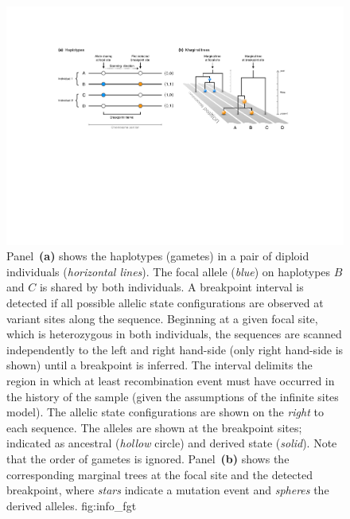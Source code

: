 

\begin{figure}[!htb]
\centering
\includegraphics[width=\textwidth]{./img/ch3/info_fgt_new}
{Panel~\textbf{(a)} shows the  haplotypes (gametes) in a pair of  diploid individuals (\emph{horizontal lines}).
The focal allele (\emph{blue}) on haplotypes $B$ and $C$ is shared by both individuals.
A breakpoint interval is detected if all  possible allelic state configurations are observed at  variant sites along the sequence.
Beginning at a given focal site, which is heterozygous in both individuals, the sequences are scanned independently to the left and right hand-side (only right hand-side is shown) until a breakpoint is inferred.
The interval delimits the region in which at least  recombination event must have occurred in the history of the sample (given the assumptions of the infinite sites model).
The  allelic state configurations are shown on the \emph{right} to each sequence.
The alleles are shown at the  breakpoint sites; indicated as ancestral (\emph{hollow} circle) and derived state (\emph{solid}).
Note that the order of gametes is ignored.
Panel~\textbf{(b)} shows the corresponding marginal trees at the focal site and the detected breakpoint, where \emph{stars} indicate a mutation event and \emph{spheres} the derived alleles.\CorrectLabel}
{fig:info_fgt}
\end{figure}
